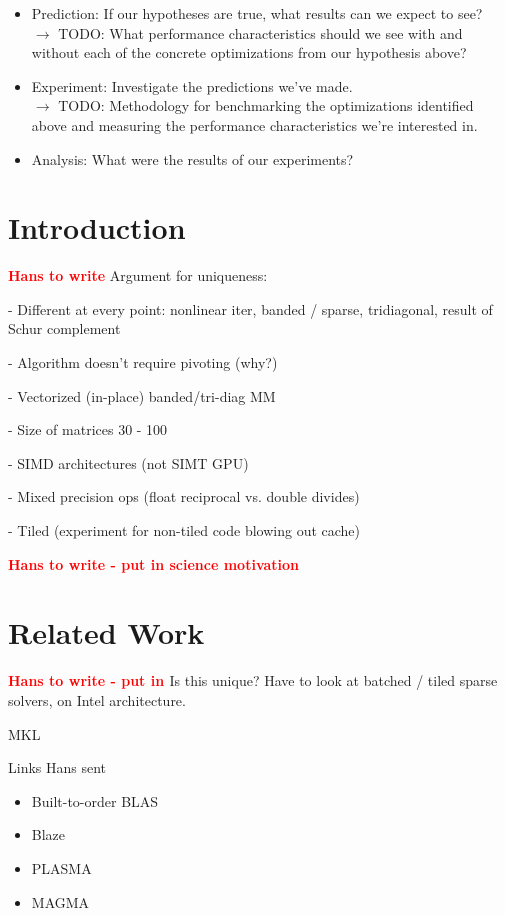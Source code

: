\documentclass[conference]{IEEEtran}
\newcommand{\fix}[1]{{\bf \textcolor {red}{#1}}}
\begin{document}
\begin{itemize}
\item Prediction: If our hypotheses are true, what results can we expect to
see? \\
$\rightarrow$ TODO: What performance characteristics should we see with and
without each of the concrete optimizations from our hypothesis above?

\item Experiment: Investigate the predictions we've made. \\
$\rightarrow$ TODO: Methodology for benchmarking the optimizations identified
above and measuring the performance characteristics we're interested
in.

\item Analysis: What were the results of our experiments?
\end{itemize}
% 

\section{Introduction}
% 
\fix{Hans to write}
Argument for uniqueness:

- Different at every point: nonlinear iter, banded / sparse, tridiagonal, result
of Schur complement

- Algorithm doesn't require pivoting (why?)

- Vectorized (in-place) banded/tri-diag MM

- Size of matrices 30 - 100

- SIMD architectures (not SIMT GPU)

- Mixed precision ops (float reciprocal vs. double divides)

- Tiled (experiment for non-tiled code blowing out cache)

\fix{Hans to write - put in science motivation}

\section{Related Work}
\fix{Hans to write - put in }
Is this unique? Have to look at batched / tiled sparse solvers, on Intel
architecture.

MKL

Links Hans sent
\begin{itemize}
\item Built-to-order BLAS \cite{Spampinato:2014}
\item Blaze \cite{BlazeSite}
\item PLASMA \cite{PLASMASite}
\item MAGMA \cite{Haidar:2015}
\end{itemize}
\end{document}
